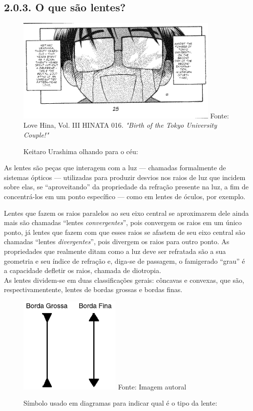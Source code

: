 \documentclass[
  a4paper]{article}
\begin{document}
\hypertarget{o-que-suxe3o-lentes}{%
\subsection{2.0.3. O que são lentes?}\label{o-que-suxe3o-lentes}}

\begin{figure}[!h]
\centering
    \caption{Keitaro Urashima olhando para o céu:} 
    \includegraphics[width=100mm]{../_img/keitaro_urashima_glasses.png}
    \linebreak
    Fonte: Love Hina, Vol. III HINATA 016. \textit{"Birth of the Tokyo University Couple!"} 
\end{figure}

As lentes são peças que interagem com a luz --- chamadas formalmente de
sistemas ópticos --- utilizadas para produzir desvios nos raios de luz
que incidem sobre elas, se ``aproveitando'' da propriedade da refração
presente na luz, a fim de concentrá-los em um ponto específico --- como
em lentes de óculos, por exemplo.

Lentes que fazem os raios paralelos ao seu eixo central se aproximarem
dele ainda mais são chamadas ``lentes \emph{convergentes}'', pois
convergem os raios em um único ponto, já lentes que fazem com que esses
raios se afastem de seu eixo central são chamadas ``lentes
\emph{divergentes}'', pois divergem os raios para outro ponto. As
propriedades que realmente ditam como a luz deve ser refratada são a sua
geometria e seu índice de refração e, diga-se de passagem, o famigerado
``grau'' é a capacidade defletir os raios, chamada de diotropia.\\
As lentes dividem-se em duas classificações gerais: côncavas e convexas,
que são, respectivamentente, lentes de bordas grossas e bordas finas.

\begin{figure}[!h]
\centering
    \caption{Símbolo usado em diagramas para indicar qual é o tipo da lente:} 
    \includegraphics[width=50mm]{../_img/borda_grossa_e_fina_lentes.png}
    \linebreak
        Fonte: Imagem autoral
\end{figure}
\end{document}
